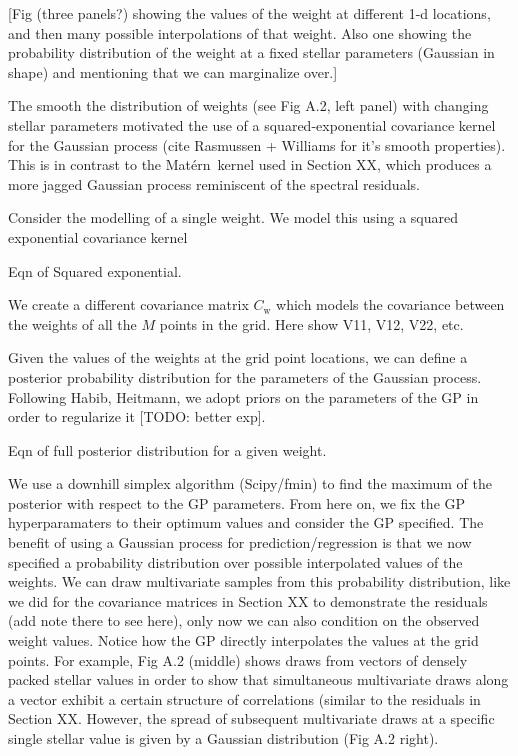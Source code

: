 \documentclass[iop,floatfix,twocolappendix]{emulateapj}
\newcommand{\matern}{Mat\'{e}rn}
\begin{document}
[Fig (three panels?) showing the values of the weight at different 1-d locations, and then many possible interpolations of that weight. Also one showing the probability distribution of the weight at a fixed stellar parameters (Gaussian in shape) and mentioning that we can marginalize over.]

The smooth the distribution of weights (see Fig A.2, left panel) with changing stellar parameters motivated the use of a squared-exponential covariance kernel for the Gaussian process (cite Rasmussen + Williams for it's smooth properties). This is in contrast to the \matern\ kernel used in Section XX, which produces a more jagged Gaussian process reminiscent of the spectral residuals.

Consider the modelling of a single weight. We model this using a squared exponential covariance kernel  

Eqn of Squared exponential.

We create a different covariance matrix $C_\textrm{w}$ which models the covariance between the weights of all the $M$ points in the grid. Here show V11, V12, V22, etc.

Given the values of the weights at the grid point locations, we can define a posterior probability distribution for the parameters of the Gaussian process. Following Habib, Heitmann, we adopt priors on the parameters of the GP in order to regularize it [TODO: better exp]. 

Eqn of full posterior distribution for a given weight.

We use a downhill simplex algorithm (Scipy/fmin) to find the maximum of the posterior with respect to the GP parameters. From here on, we fix the GP hyperparamaters to their optimum values and consider the GP specified. The benefit of using a Gaussian process for prediction/regression is that we now specified a probability distribution over possible interpolated values of the weights. We can draw multivariate samples from this probability distribution, like we did for the covariance matrices in Section XX to demonstrate the residuals (add note there to see here), only now we can also condition on the observed weight values. Notice how the GP directly interpolates the values at the grid points. For example, Fig A.2 (middle) shows draws from vectors of densely packed stellar values in order to show that simultaneous multivariate draws along a vector exhibit a certain structure of correlations (similar to the residuals in Section XX. However, the spread of subsequent multivariate draws at a specific single stellar value is given by a Gaussian distribution (Fig A.2 right).
\end{document}
